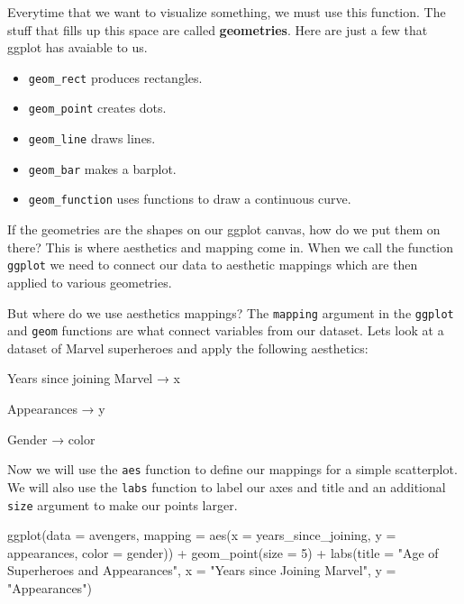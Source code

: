 \documentclass[
]{book}
\newenvironment{Shaded}{\begin{snugshade}}{\end{snugshade}}
\newcommand{\AttributeTok}[1]{\textcolor[rgb]{0.77,0.63,0.00}{#1}}
\newcommand{\DecValTok}[1]{\textcolor[rgb]{0.00,0.00,0.81}{#1}}
\newcommand{\FunctionTok}[1]{\textcolor[rgb]{0.00,0.00,0.00}{#1}}
\newcommand{\NormalTok}[1]{#1}
\newcommand{\SpecialCharTok}[1]{\textcolor[rgb]{0.00,0.00,0.00}{#1}}
\newcommand{\StringTok}[1]{\textcolor[rgb]{0.31,0.60,0.02}{#1}}
\providecommand{\tightlist}{%
  \setlength{\itemsep}{0pt}\setlength{\parskip}{0pt}}
\begin{document}
Everytime that we want to visualize something, we must use this function. The stuff that fills up this space are called \textbf{geometries}. Here are just a few that ggplot has avaiable to us.

\begin{itemize}
\tightlist
\item
  \texttt{geom\_rect} produces rectangles.
\item
  \texttt{geom\_point} creates dots.
\item
  \texttt{geom\_line} draws lines.
\item
  \texttt{geom\_bar} makes a barplot.
\item
  \texttt{geom\_function} uses functions to draw a continuous curve.
\end{itemize}

If the geometries are the shapes on our ggplot canvas, how do we put them on there? This is where aesthetics and mapping come in. When we call the function \texttt{ggplot} we need to connect our data to aesthetic mappings which are then applied to various geometries.

But where do we use aesthetics mappings? The \texttt{mapping} argument in the \texttt{ggplot} and \texttt{geom} functions are what connect variables from our dataset. Lets look at a dataset of Marvel superheroes and apply the following aesthetics:

Years since joining Marvel → x

Appearances → y

Gender → color

Now we will use the \texttt{aes} function to define our mappings for a simple scatterplot. We will also use the \texttt{labs} function to label our axes and title and an additional \texttt{size} argument to make our points larger.

\begin{Shaded}
\begin{Highlighting}[]
\FunctionTok{ggplot}\NormalTok{(}\AttributeTok{data =}\NormalTok{ avengers, }\AttributeTok{mapping =} \FunctionTok{aes}\NormalTok{(}\AttributeTok{x =}\NormalTok{ years\_since\_joining,}
                                      \AttributeTok{y =}\NormalTok{ appearances,}
                                      \AttributeTok{color =}\NormalTok{ gender)) }\SpecialCharTok{+}
  \FunctionTok{geom\_point}\NormalTok{(}\AttributeTok{size =} \DecValTok{5}\NormalTok{) }\SpecialCharTok{+}
  \FunctionTok{labs}\NormalTok{(}\AttributeTok{title =} \StringTok{"\textquotesingle{}Age\textquotesingle{} of Superheroes and Appearances"}\NormalTok{,}
       \AttributeTok{x =} \StringTok{"Years since Joining Marvel"}\NormalTok{,}
       \AttributeTok{y =} \StringTok{"Appearances"}\NormalTok{)}
\end{Highlighting}
\end{Shaded}
\end{document}
